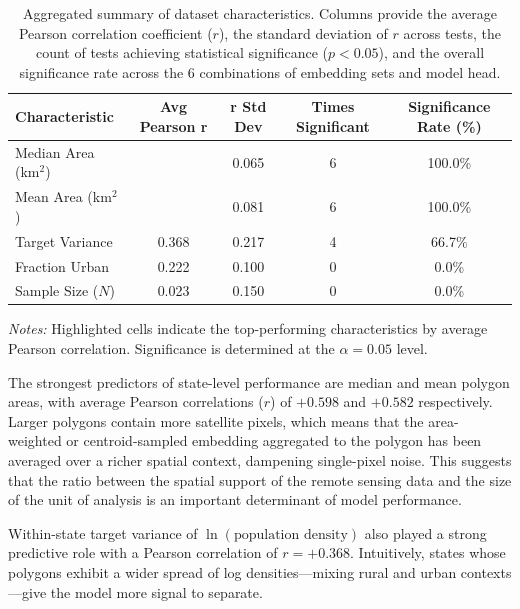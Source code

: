 \documentclass[12pt,letterpaper]{article}
\begin{document}
\begin{table}[H]
  \centering
  \caption{Aggregated summary of dataset characteristics. Columns provide the average Pearson correlation coefficient ($r$), the standard deviation of $r$ across tests, the count of tests achieving statistical significance ($p < 0.05$), and the overall significance rate across the 6 combinations of embedding sets and model head.}
  \label{tab:avgcharacteristics}
  \footnotesize
  \renewcommand{\arraystretch}{1.15}
  \setlength{\tabcolsep}{8pt}
  \begin{tabular}{@{} l cccc @{}}
    \toprule
    \textbf{Characteristic} & \textbf{Avg Pearson r} & \textbf{r Std Dev} & \textbf{Times Significant} & \textbf{Significance Rate (\%)} \\ 
    \midrule
    Median Area (km$^2$) & \cellcolor{teal!15}{0.598} & 0.065 & 6 & 100.0\% \\
    Mean Area (km$^2$)   & \cellcolor{teal!15}{0.582} & 0.081 & 6 & 100.0\% \\
    Target Variance      & 0.368 & 0.217 & 4 & 66.7\% \\
    Fraction Urban       & 0.222 & 0.100 & 0 & 0.0\% \\
    Sample Size ($N$)    & 0.023 & 0.150 & 0 & 0.0\% \\
    \bottomrule
  \end{tabular}

  \medskip
  \raggedright
  \textit{Notes:} \colorbox{teal!15}{Highlighted} cells indicate the top-performing characteristics by average Pearson correlation. Significance is determined at the $\alpha = 0.05$ level.
\end{table}

The strongest predictors of state-level performance are median and mean polygon areas, with average Pearson correlations ($r$) of $+0.598$ and $+0.582$ respectively. Larger polygons contain more satellite pixels, which means that the area-weighted or centroid-sampled embedding aggregated to the polygon has been averaged over a richer spatial context, dampening single-pixel noise. This suggests that the ratio between the spatial support of the remote sensing data and the size of the unit of analysis is an important determinant of model performance. 

Within-state target variance of $\ln(\text{population density})$ also played a strong predictive role with a Pearson correlation of $r=+0.368$. Intuitively, states whose polygons exhibit a wider spread of log densities---mixing rural and urban contexts---give the model more signal to separate. 
\end{document}
